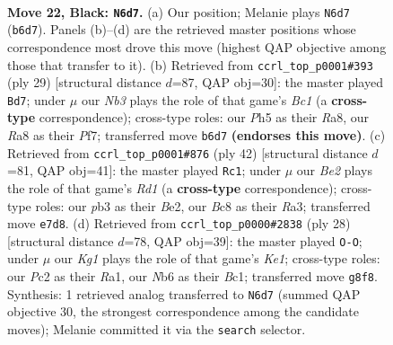 \documentclass[11pt]{article}
\begin{document}
\clearpage

\begin{figure}[p]\centering
\begin{subfigure}{0.46\textwidth}\centering
\resizebox{\linewidth}{!}{%
\newchessgame
\chessboard[
  setfen={rnb3k1/1p2b3/pn1rppp1/7p/8/1P2P1P1/P1pNPK1P/R1B1R2B b - - 1 22},
  showmover=false,
  pgfstyle=straightmove, color=movearrow, markmove={b6-d7}
]}
\caption{}
\end{subfigure}\hfill
\begin{subfigure}{0.46\textwidth}\centering
\resizebox{\linewidth}{!}{%
\newchessgame
\chessboard[
  setfen={r1b2rk1/p3bppp/n4n2/N1pp4/N7/6P1/PP2PPBP/R1B2RK1 b - - 2 15},
  showmover=false,
  pgfstyle=straightmove, color=movearrow, markmove={c8-d7}
]}
\caption{}
\end{subfigure}
\\[4pt]
\begin{subfigure}{0.46\textwidth}\centering
\resizebox{\linewidth}{!}{%
\newchessgame
\chessboard[
  setfen={r1b1rk2/1p3pp1/2p4p/p1n5/P2N3P/R3PP2/1P2B1P1/3R2K1 w - - 1 22},
  showmover=false,
  pgfstyle=straightmove, color=movearrow, markmove={d1-c1}
]}
\caption{}
\end{subfigure}\hfill
\begin{subfigure}{0.46\textwidth}\centering
\resizebox{\linewidth}{!}{%
\newchessgame
\chessboard[
  setfen={r1b1r1k1/pp3ppp/1bn5/8/8/1N3BP1/PP2PP1P/R1B1K2R w KQ - 3 15},
  showmover=false,
  pgfstyle=straightmove, color=movearrow, markmove={e1-g1}
]}
\caption{}
\end{subfigure}
\caption{\textbf{Move 22, Black: \texttt{N6d7}.} (a) Our position; Melanie plays \texttt{N6d7} (\texttt{b6d7}). Panels (b)--(d) are the retrieved master positions whose correspondence most drove this move (highest QAP objective among those that transfer to it). (b) Retrieved from \texttt{ccrl\_top\_p0001\#393} (ply 29) [structural distance $d$=87, QAP obj=30]: the master played \texttt{Bd7}; under $\mu$ our \emph{Nb3} plays the role of that game's \emph{Bc1} (a \textbf{cross-type} correspondence); cross-type roles: our \emph{P}h5 as their \emph{R}a8, our \emph{R}a8 as their \emph{P}f7; transferred move \texttt{b6d7} \textbf{(endorses this move)}. (c) Retrieved from \texttt{ccrl\_top\_p0001\#876} (ply 42) [structural distance $d$=81, QAP obj=41]: the master played \texttt{Rc1}; under $\mu$ our \emph{Be2} plays the role of that game's \emph{Rd1} (a \textbf{cross-type} correspondence); cross-type roles: our \emph{p}b3 as their \emph{B}e2, our \emph{B}c8 as their \emph{R}a3; transferred move \texttt{e7d8}. (d) Retrieved from \texttt{ccrl\_top\_p0000\#2838} (ply 28) [structural distance $d$=78, QAP obj=39]: the master played \texttt{O-O}; under $\mu$ our \emph{Kg1} plays the role of that game's \emph{Ke1}; cross-type roles: our \emph{P}c2 as their \emph{R}a1, our \emph{N}b6 as their \emph{B}c1; transferred move \texttt{g8f8}. Synthesis: 1 retrieved analog transferred to \texttt{N6d7} (summed QAP objective 30, the strongest correspondence among the candidate moves); Melanie committed it via the \texttt{search} selector.}
\label{fig:thought-m43}
\end{figure}
\end{document}
